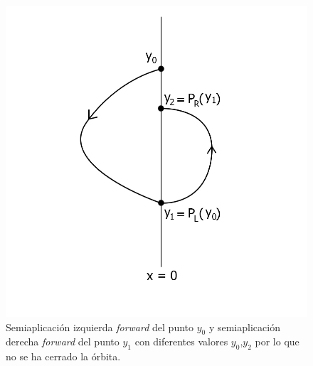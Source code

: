 \documentclass[12pt,a4paper]{report} %
\begin{document}
	
	\newpage
	
	 \begin{figure}[h]
		\centering
		\includegraphics[width=1\textwidth]{aplipoincareLR.jpg}
		\caption{Semiaplicación izquierda \textit{forward} del punto $y_0$ y semiaplicación derecha \textit{forward} del punto $y_1$ con diferentes valores $y_0$,$y_2$ por lo que no se ha cerrado la órbita.}
		\label{fig:aplipoincareLR}
	\end{figure}\smallskip
	
	\newpage
	
\end{document}
